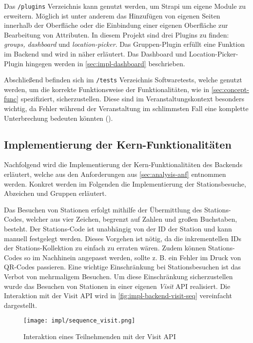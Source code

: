 Das \lstinline[style=code, style=inline]{/plugins} Verzeichnis kann genutzt
werden, um Strapi um eigene Module zu erweitern. Möglich ist unter anderem das
Hinzufügen von eigenen Seiten innerhalb der Oberfläche oder die Einbindung einer
eigenen Oberfläche zur Bearbeitung von Attributen. In diesem Projekt sind drei
Plugins zu finden: \textit{groups, dashboard} und \textit{location-picker}. Das
Gruppen-Plugin erfüllt eine Funktion im Backend und wird in
 näher erläutert. Das Dash\-board und
Location-Picker-Plugin hingegen werden in \autoref{sec:impl-dashboard}
beschrieben.

Abschließend befinden sich im \lstinline[style=code, style=inline]{/tests}
Verzeichnis Softwaretests, welche genutzt werden, um die korrekte Funktionsweise
der Funktionalitäten, wie in \autoref{sec:concept-func} spezifiziert,
sicherzustellen. Diese sind im Veranstaltungskontext besonders wichtig, da
Fehler während der Veranstaltung im schlimmsten Fall eine komplette
Unterbrechung bedeuten könnten ().

\subsection{Implementierung der Kern-Funktionalitäten} \label{ssec:impl-backend-func}

Nachfolgend wird die Implementierung der Kern-Funktionalitäten des Backends
erläutert, welche aus den Anforderungen aus \autoref{sec:analysis-anf} entnommen
werden. Konkret werden im Folgenden die Implementierung der Stationsbesuche,
Abzeichen und Gruppen erläutert.

Das Besuchen von Stationen erfolgt mithilfe der Übermittlung des Stations-Codes,
welcher aus vier Zeichen, begrenzt auf Zahlen und großen Buchstaben, besteht.
Der Stations-Code ist unabhängig von der ID der Station und kann manuell
festgelegt werden. Dieses Vorgehen ist nötig, da die inkrementellen IDs der
Stations-Kollektion zu einfach zu erraten wären. Zudem können Stations-Codes so
im Nachhinein angepasst werden, sollte z. B. ein Fehler im Druck von QR-Codes
passieren. Eine wichtige Einschränkung bei Stationsbesuchen ist das Verbot von
mehrmaligem Besuchen. Um diese Einschränkung sicherzustellen wurde das Besuchen
von Stationen in einer eigenen \textit{Visit} API realisiert. Die Interaktion
mit der Visit API wird in \autoref{fig:impl-backend-visit-seq} vereinfacht dargestellt.

\begin{figure}[htpb]
    \centering
    \texttt{[image: impl/sequence\_visit.png]}
    \caption{Interaktion eines Teilnehmenden mit der Visit API}
    \label{fig:impl-backend-visit-seq}
\end{figure}

